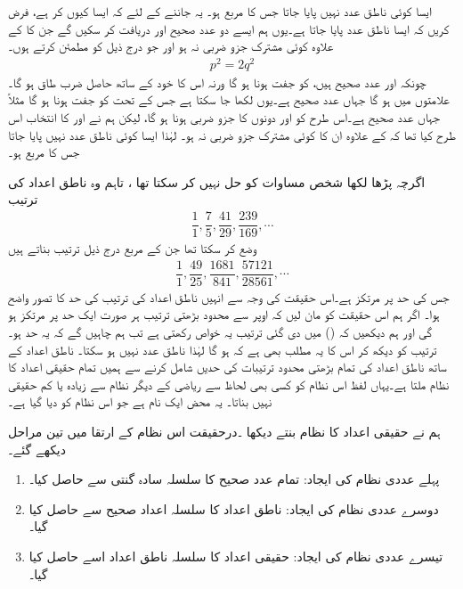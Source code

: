  ایسا کوئی  ناطق عدد نہیں  پایا جاتا جس کا  مربع   ہو۔ یہ جاننے کے لئے کہ ایسا کیوں کر ہے، فرض کریں  کہ ایسا  ناطق عدد پایا جاتا ہے۔یوں ہم ایسے  دو عدد صحیح  اور   دریافت کر سکیں گے جن  کا  کے علاوہ کوئی مشترک جزو ضربی  نہ ہو اور  جو درج ذیل کو مطمئن کرتے ہوں۔
\begin{align}
p^2=2q^2
\end{align}
چونکہ  اور  عدد صحیح ہیں،   کو  جفت ہونا ہو گا ورنہ اس کا  خود کے  ساتھ حاصل ضرب طاق ہو گا۔ علامتوں میں  ہو گا جہاں  عدد صحیح ہے۔یوں   لکھا جا سکتا ہے جس کے تحت  کو جفت ہونا ہو گا مثلاً   جہاں  عدد صحیح ہے۔اس طرح  کو  اور  دونوں کا جزو ضربی ہونا ہو گا،  لیکن ہم نے  اور  کا انتخاب اس طرح کیا  تھا کہ  کے علاوہ ان کا کوئی مشترک جزو ضربی نہ ہو۔ لہٰذا ایسا کوئی ناطق عدد نہیں پایا جاتا جس کا مربع  ہو۔

اگرچہ  پڑھا لکھا شخص مساوات    کو حل نہیں کر سکتا تھا ،  تاہم وہ ناطق اعداد   کی ترتیب 
\begin{align}\label{مساوات_ضمیمہ_خیالی_چار}
\dfrac{1}{1}, \dfrac{7}{5}, \dfrac{41}{29}, \dfrac{239}{169}, \cdots
\end{align}
وضع کر سکتا تھا جن کے مربع درج ذیل ترتیب بناتے ہیں
\begin{align}\label{مساوات_ضمیمہ_خیالی_پانچ}
\dfrac{1}{1}, \dfrac{49}{25}, \dfrac{1681}{841}, \dfrac{57121}{28561}, \cdots
\end{align}
جس کی حد   پر مرتکز ہے۔اس حقیقت  کی وجہ سے    انہیں ناطق اعداد کی ترتیب کی حد  کا تصور واضح ہوا۔ اگر ہم  اس حقیقت کو  مان لیں کہ اوپر سے محدود  بڑھتی  ترتیب   ہر صورت  ایک حد پر مرتکز ہو گی   اور  ہم دیکھیں کہ   ()   میں دی گئی  ترتیب  یہ خواص رکھتی ہے تب ہم  چاہیں گے کہ یہ حد  ہو۔ ترتیب   کو دیکھ کر اس کا یہ مطلب بھی  ہے کہ  ہو گا لہٰذا     ناطق عدد نہیں ہو سکتا۔  ناطق  اعداد کے ساتھ   ناطق اعداد کی تمام بڑھتی  محدود ترتیبات کی حدیں  شامل کرنے سے ہمیں تمام   حقیقی اعداد کا نظام ملتا ہے۔یہاں  لفظ   اس نظام  کو کسی بھی لحاظ سے ریاضی کے دیگر  نظام سے زیادہ یا کم حقیقی نہیں بناتا۔ یہ محض ایک نام ہے جو اس نظام کو دیا گیا ہے۔

ہم نے  حقیقی  اعداد کا نظام  بنتے دیکھا ۔درحقیقت اس نظام  کے ارتقا میں  تین مراحل  دیکھے گئے۔
\begin{enumerate}[1.]
\item
پہلے عددی نظام  کی ایجاد: \quad
تمام عدد صحیح  کا  سلسلہ  سادہ گنتی سے حاصل کیا۔
\item
دوسرے  عددی نظام کی ایجاد:\quad
ناطق اعداد  کا سلسلہ   اعداد صحیح  سے  حاصل کیا گیا۔
\item
تیسرے عددی نظام کی ایجاد:\quad
حقیقی اعداد  کا سلسلہ  ناطق اعداد اسے  حاصل کیا گیا۔
\end{enumerate}


